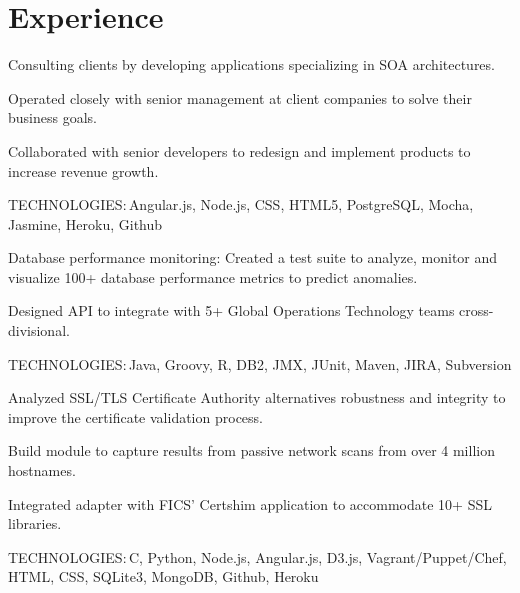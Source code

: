 \documentclass[]{cls}
\def\kt{\vspace*{2pt}\textsc{TECHNOLOGIES:\,}}
\begin{document}
\begin{minipage}[t]{0.66\textwidth} 


\section{Experience}
\sectionsep

\vspace{\topsep}
\begin{tightemize}
\item Consulting clients by developing applications specializing in SOA architectures. 
\item Operated closely with senior management at client companies to solve their business goals.
\item Collaborated with senior developers to redesign and implement products to increase revenue growth.
\end{tightemize}
\kt Angular.js, Node.js, CSS, HTML5, PostgreSQL, Mocha, Jasmine, Heroku, Github

\sectionsep

\begin{tightemize}
\item Database performance monitoring: Created a test suite to analyze, monitor and visualize 100+ database performance metrics to predict anomalies.
\item Designed API to integrate with 5+ Global Operations Technology teams cross-divisional.
\end{tightemize}
\kt Java, Groovy, R, DB2, JMX, JUnit, Maven, JIRA, Subversion

\sectionsep


\begin{tightemize}
\item Analyzed SSL/TLS Certificate Authority alternatives robustness and integrity to improve the certificate validation process.
\item Build module to capture results from passive network scans from over 4 million hostnames.
\item Integrated adapter with FICS' Certshim application to accommodate 10+ SSL libraries.
\end{tightemize}
\kt C, Python, Node.js, Angular.js, D3.js, Vagrant/Puppet/Chef, HTML, CSS, SQLite3, MongoDB, Github, Heroku


\end{minipage}
\end{document}
